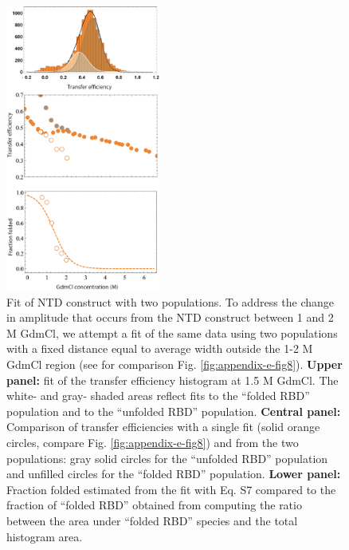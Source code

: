\documentclass[../main.tex]{subfiles}
\begin{document}
        \begin{figure}[!htb] %
            \centering
            \includegraphics[width=2in]{appendix-e-fig9.png}
            \caption[Fit of NTD construct with two populations.]
                {Fit of NTD construct with two populations. To address the change in amplitude that occurs from the NTD construct between 1 and 2 M GdmCl, we attempt a fit of the same data using two populations with a fixed distance equal to average width outside the 1-2 M GdmCl region (see for comparison Fig. \ref{fig:appendix-e-fig8}). \textbf{Upper panel:} fit of the transfer efficiency histogram at 1.5 M GdmCl. The white- and gray- shaded areas reflect fits to the “folded RBD” population and to the “unfolded RBD” population. \textbf{Central panel:} Comparison of transfer efficiencies with a single fit (solid orange circles, compare Fig. \ref{fig:appendix-e-fig8}) and from the two populations: gray solid circles for the “unfolded RBD” population and unfilled circles for the “folded RBD” population. \textbf{Lower panel:} Fraction folded estimated from the fit with Eq. S7 compared to the fraction of “folded RBD” obtained from computing the ratio between the area under “folded RBD” species and the total histogram area.}
            \label{fig:appendix-e-fig9}
        \end{figure}
\end{document}
